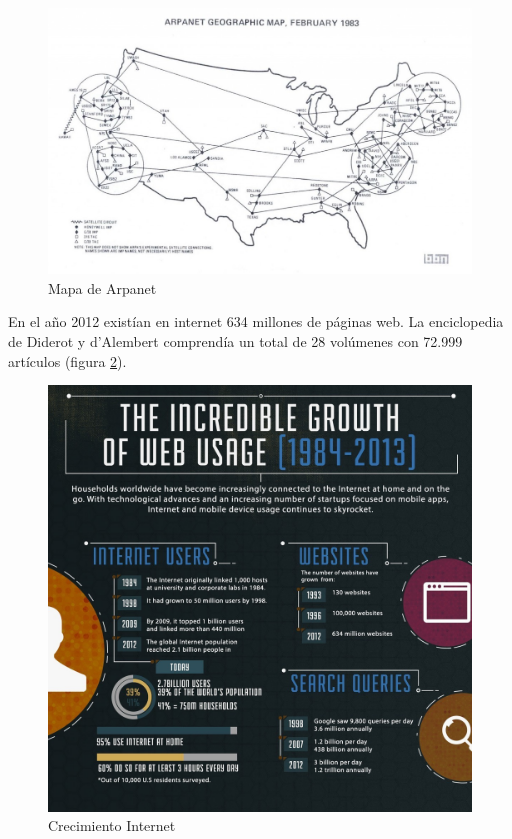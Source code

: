 \begin{figure}[hbtp]
\centering
\includegraphics[width=180mm]{images/introduccion/Mapa_de_Arpanet.jpg}
\caption{Mapa de Arpanet}
\label{fig:Arpanet}
\end{figure}


En el año 2012 existían en internet 634 millones de páginas web. La enciclopedia de Diderot y d'Alembert comprendía un total de 28 volúmenes con 72.999 artículos (figura \ref{fig:Crecimiento_Internet}). %

\begin{figure}[hbtp]
\centering
\includegraphics[width=150mm]{images/introduccion/Grafico_paginas_web.jpg}
\caption{Crecimiento Internet}
\label{fig:Crecimiento_Internet}
\end{figure}


